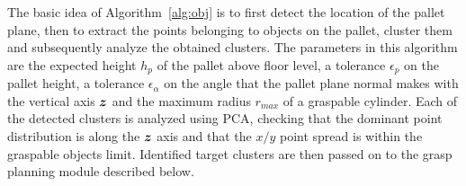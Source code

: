 %
\par
The basic idea of Algorithm~\ref{alg:obj} is to first detect the location of the pallet plane, then
to extract the points belonging to objects on the pallet, cluster them and subsequently analyze the
obtained clusters. The parameters in this algorithm are the expected height $h_p$ of the
pallet above floor level, a tolerance $\epsilon_p$ on the pallet height, a tolerance
$\epsilon_{\alpha}$ on the angle that the pallet plane normal makes with the vertical axis $\mbox{\boldmath $z$}$
and the maximum radius $r_{max}$ of a graspable cylinder. Each of the detected clusters is analyzed
using PCA, checking that the dominant point distribution is along the $\mbox{\boldmath $z$}$ axis and that the
$x/y$ point spread is within the graspable objects limit. Identified target clusters are then passed
on to the grasp planning module described below.
%
